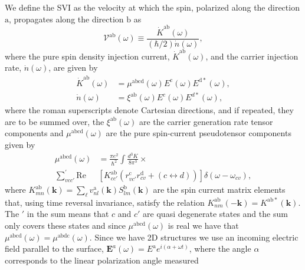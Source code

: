 \documentclass[prb,11pt,tightenlines,twocolumn,aps]{revtex4-1}
\begin{document}
We define the SVI as the velocity at which the spin, polarized along the
direction $\mathrm{a}$, propagates along the direction $\mathrm{b}$ as
\begin{equation}\label{eq:vab-w}
\mathcal{V}^{\mathrm{ab}}(\omega) \equiv
\frac{\dot{K}^{\mathrm{ab}}(\omega)}{(\hbar/2) \dot{n}(\omega)},
\end{equation}  
where the pure spin density injection current, $\dot{K}^{\mathrm{ab}}
(\omega)$, and the carrier injection rate, $\dot{n}(\omega)$, are given by
% 
\begin{equation}\label{eq:dot-kn}
\begin{aligned}
\dot{K}^{\mathrm{ab}}(\omega) 
&=
\mu^{\mathrm{abcd}}(\omega)
E^{\mathrm{c}}(\omega) E^{\mathrm{d*}}(\omega),
\\
\dot{n}(\omega)
&=
\xi^{\mathrm{ab}}(\omega) E^{c }(\omega) E^{d*}(\omega),
\end{aligned}
\end{equation}
where the roman superscripts denote Cartesian directions, and if repeated, they
are to be summed over, the $\xi^{\mathrm{ab}}(\omega)$ are the carrier
generation rate tensor components and $\mu^{\mathrm{abcd}}(\omega)$ are the
pure spin-current pseudotensor components given by\cite{bhatPRL05}
\begin{equation*}\label{eq:mu}
\begin{aligned}
\mu^{\mathrm{abcd}}  (\omega) &
=
\frac{\pi e^{2}}{\hbar^{2}} \int 
\frac{d^{3}K}{8 \pi^{3}} \times \\
\sum_{vcc'}^{'}
\mathrm{Re} & \left[ K^{\mathrm{ab}}_{cc'} 
\left( 
r^{\mathrm{c}}_{vc'} 
r^{\mathrm{d}}_{cv } +
(c \leftrightarrow d)
\right) 
\right] \delta(\omega-\omega_{cv}),
\end{aligned}
\end{equation*}
where $K^{\mathrm{ab}}_{mn}(\mathbf{k}) =
\sum_{\ell}v^{\mathrm{a}}_{nl}(\mathbf{k}) S^{\mathrm{b}}_{lm}(\mathbf{k})$ are
the spin current matrix elements that, using time reversal invariance, satisfy
the relation $K^{\mathrm{ab}}_{nm}(\mathbf{-k}) = K^{\mathrm{ab*}}(\mathbf{k})
$. 
% 
The $'$ in the sum means that $c$ and $c'$ are quasi degenerate states and the
sum only covers these states and since $\mu^{\mathrm{abcd}}(\omega)$ is real we
have that $\mu^{\mathrm{abcd}}(\omega) = \mu^{\mathrm{abdc}}(\omega)$.
% 
Since we have 2D structures we use an incoming electric field parallel to the
surface, $\mathbf{E}^{a}(\omega) = E^{\mathrm{a}} e^{i(\alpha + \omega t)}$,
where the angle $\alpha$ corresponds to the linear polarization angle measured
\end{document}
